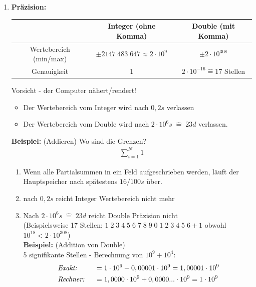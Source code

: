 \documentclass[12pt]{article}
\begin{document}
\begin{enumerate}
\item \textbf{Präzision:} \\

\begin{center}
\begin{tabular}{|c|c|c|}
\hline 
 & \textbf{Integer} (ohne Komma) & \textbf{Double} (mit Komma) \\ \hline
 Wertebereich (min/max) & $\pm 2147 \; 483 \; 647 \approx 2 \cdot 10^9$ & $\pm 2 \cdot 10^{308} $ \\
 Genauigkeit & 1 & $2 \cdot 10^{-16} \widehat{=} 17$ Stellen \\ \hline
\end{tabular} 
\end{center}
Vorsicht - der Computer nähert/rendert! \\
\begin{itemize}
\item Der Wertebereich vom Integer wird nach $0,2 s$ verlassen
\item Der Wertebereich vom Double wird nach $2 \cdot 10^6 s \; \widehat{=} \; 23 d$ verlassen.
\end{itemize}
\textbf{Beispiel:} (Addieren) Wo sind die Grenzen?
\begin{align*}
\sum_{i=1}^N 1
\end{align*}
\begin{enumerate}

\item Wenn alle Partialsummen in ein Feld aufgeschrieben werden, läuft der Hauptspeicher nach spätestens $16/100s$ über.

\item nach $0,2s$ reicht Integer Wertebereich nicht mehr %

\item Nach $ 2 \cdot 10^6 s \; \widehat{=} \; 23 d$ reicht Double Präzision nicht \\
(Beispielsweise 17 Stellen: $ 1\; 2 \; 3\; 4\; 5\; 6\; 7\; 8\; 9\; 0 \;1\; 2\; 3\; 4 \; 5 \; 6 +1$ obwohl $10^{18} < 2 \cdot 10^{308}$) \\

\textbf{Beispiel:} (Addition von Double) \\
5 signifikante Stellen - Berechnung von $10^9 + 10^4$:
\begin{align*}
& \mbox{ \textit{Exakt:} }  \;  && = 1 \cdot 10^9 + 0,00001 \cdot 10^9 = 1,00001 \cdot 10^9 \\
& \mbox{ \textit{Rechner:} }  &&= 1,0000 \cdot 10^9 + 0,0000... \cdot 10^9 = 1 \cdot 10^9
\end{align*}


\end{enumerate}
\end{enumerate}
\end{document}
